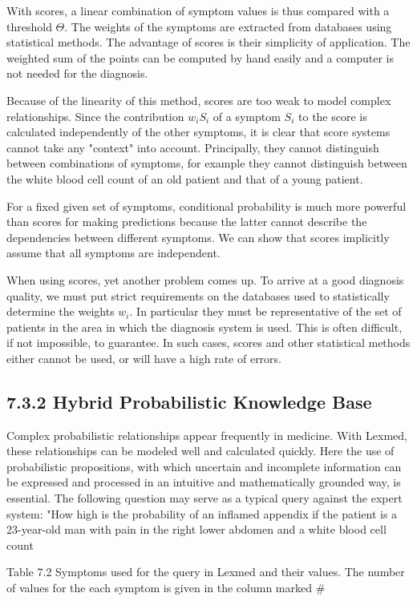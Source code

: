 \documentclass[10pt]{article}
\begin{document}
With scores, a linear combination of symptom values is thus compared with a threshold $\Theta$. The weights of the symptoms are extracted from databases using statistical methods. The advantage of scores is their simplicity of application. The weighted sum of the points can be computed by hand easily and a computer is not needed for the diagnosis.

Because of the linearity of this method, scores are too weak to model complex relationships. Since the contribution $w_{i} S_{i}$ of a symptom $S_{i}$ to the score is calculated independently of the other symptoms, it is clear that score systems cannot take any "context" into account. Principally, they cannot distinguish between combinations of symptoms, for example they cannot distinguish between the white blood cell count of an old patient and that of a young patient.

For a fixed given set of symptoms, conditional probability is much more powerful than scores for making predictions because the latter cannot describe the dependencies between different symptoms. We can show that scores implicitly assume that all symptoms are independent.

When using scores, yet another problem comes up. To arrive at a good diagnosis quality, we must put strict requirements on the databases used to statistically determine the weights $w_{i}$. In particular they must be representative of the set of patients in the area in which the diagnosis system is used. This is often difficult, if not impossible, to guarantee. In such cases, scores and other statistical methods either cannot be used, or will have a high rate of errors.

\subsection*{7.3.2 Hybrid Probabilistic Knowledge Base}
Complex probabilistic relationships appear frequently in medicine. With Lexmed, these relationships can be modeled well and calculated quickly. Here the use of probabilistic propositions, with which uncertain and incomplete information can be expressed and processed in an intuitive and mathematically grounded way, is essential. The following question may serve as a typical query against the expert system: "How high is the probability of an inflamed appendix if the patient is a 23-year-old man with pain in the right lower abdomen and a white blood cell count

Table 7.2 Symptoms used for the query in Lexmed and their values. The number of values for the each symptom is given in the column marked \#
\end{document}
